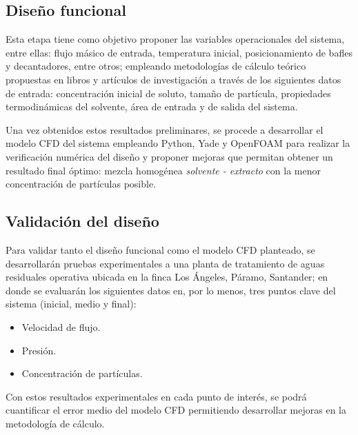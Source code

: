 \subsection{Dise\~no funcional}

\noindent
\justify

Esta etapa tiene como objetivo proponer las variables operacionales del sistema, entre ellas: flujo m\'asico de entrada, temperatura inicial, posicionamiento de bafles y decantadores, entre otros; empleando metodolog\'ias de c\'alculo te\'orico propuestas en libros y art\'iculos de investigaci\'on a trav\'es de los siguientes datos de entrada: concentraci\'on inicial de soluto, tama\~no de part\'icula, propiedades termodin\'amicas del solvente, \'area de entrada y de salida del sistema.

\noindent
\justify

Una vez obtenidos estos resultados preliminares, se procede a desarrollar el modelo CFD del sistema empleando Python, Yade y OpenFOAM para realizar la verificaci\'on num\'erica del dise\~no y proponer mejoras que permitan obtener un resultado final \'optimo: mezcla homog\'enea \textit{solvente - extracto} con la menor concentraci\'on de part\'iculas posible.

\newpage

\subsection{Validaci\'on del dise\~no}

\noindent
\justify

Para validar tanto el dise\~no funcional como el modelo CFD planteado, se desarrollar\'an pruebas experimentales a una planta de tratamiento de aguas residuales operativa ubicada en la finca Los \'Angeles, P\'aramo, Santander; en donde se evaluar\'an los siguientes datos en, por lo menos, tres puntos clave del sistema (inicial, medio y final):

\begin{itemize}
	\item Velocidad de flujo.
	\item Presi\'on.
	\item Concentraci\'on de part\'iculas.
\end{itemize}

\noindent
\justify

Con estos resultados experimentales en cada punto de inter\'es, se podr\'a cuantificar el error medio del modelo CFD permitiendo desarrollar mejoras en la metodolog\'ia de c\'alculo.

